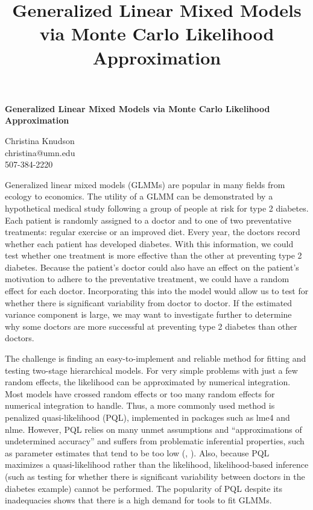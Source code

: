 \documentclass[12pt]{article}
\title{Generalized Linear Mixed Models via Monte Carlo Likelihood Approximation}
\author{}
\date{}
\newcommand{\ncite}[1]{\citeauthor{#1}, \citeyear{#1}}
\begin{document}
 \centerline{\large \bf Generalized Linear Mixed Models via Monte Carlo Likelihood Approximation} %

 \medskip

 \centerline{Christina Knudson\\
christina@umn.edu\\
507-384-2220}
 \smallskip
{}

Generalized linear mixed models (GLMMs) are popular in many fields from ecology to economics. The utility of a GLMM can be demonstrated by a hypothetical medical study following a group of people at risk for type 2 diabetes. Each patient is randomly assigned to a doctor and to one of two preventative treatments: regular exercise or an improved diet. Every year, the doctors record  whether each patient has developed diabetes. With this information, we could test whether one treatment is more effective than the other at preventing type 2 diabetes.  Because the patient's doctor could also have an effect on the patient's motivation to adhere to the preventative treatment, we could have a random effect for each doctor. Incorporating this into the model would allow us to test for whether there is significant variability from doctor to doctor.  If the estimated variance component is large, we may want to investigate further  to determine why some doctors are more successful at preventing type 2 diabetes than other doctors.


The challenge is finding an easy-to-implement and reliable method for fitting and testing two-stage hierarchical models. For very simple problems with just a few random effects, the likelihood can be approximated by numerical integration.  Most models have crossed random effects or too many random effects for numerical integration to handle. Thus, a more commonly used method is penalized quasi-likelihood (PQL), implemented in packages such as lme4 and nlme. However, PQL relies on many unmet assumptions and ``approximations of undetermined accuracy'' and suffers from problematic inferential properties, such as parameter estimates that tend to be too low (\ncite{mccu:sear:2001}). Also, because PQL maximizes a quasi-likelihood rather than the likelihood,  likelihood-based inference (such as testing for whether there is significant variability between doctors in the diabetes example) cannot be performed.  The popularity of PQL despite its inadequacies shows that there is a high demand for tools to fit GLMMs.
\end{document}
